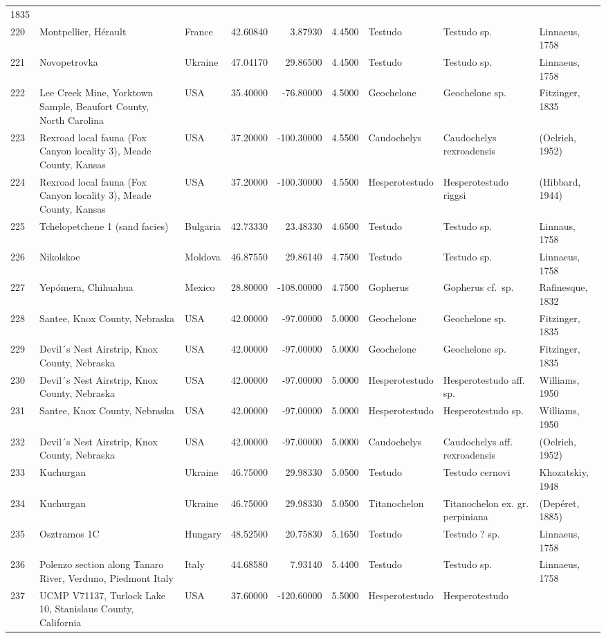 \documentclass[]{article}
\begin{document}
\begin{longtable}[]{@{}lllrrrlll@{}}
1835\tabularnewline
220 & Montpellier, Hérault & France & 42.60840 & 3.87930 & 4.4500 &
Testudo & Testudo sp. & Linnaeus, 1758\tabularnewline
221 & Novopetrovka & Ukraine & 47.04170 & 29.86500 & 4.4500 & Testudo &
Testudo sp. & Linnaeus, 1758\tabularnewline
222 & Lee Creek Mine, Yorktown Sample, Beaufort County, North Carolina &
USA & 35.40000 & -76.80000 & 4.5000 & Geochelone & Geochelone sp. &
Fitzinger, 1835\tabularnewline
223 & Rexroad local fauna (Fox Canyon locality 3), Meade County, Kansas
& USA & 37.20000 & -100.30000 & 4.5500 & Caudochelys & Caudochelys
rexroadensis & (Oelrich, 1952)\tabularnewline
224 & Rexroad local fauna (Fox Canyon locality 3), Meade County, Kansas
& USA & 37.20000 & -100.30000 & 4.5500 & Hesperotestudo & Hesperotestudo
riggsi & (Hibbard, 1944)\tabularnewline
225 & Tchelopetchene 1 (sand facies) & Bulgaria & 42.73330 & 23.48330 &
4.6500 & Testudo & Testudo sp. & Linnaus, 1758\tabularnewline
226 & Nikolskoe & Moldova & 46.87550 & 29.86140 & 4.7500 & Testudo &
Testudo sp. & Linnaeus, 1758\tabularnewline
227 & Yepómera, Chihuahua & Mexico & 28.80000 & -108.00000 & 4.7500 &
Gopherus & Gopherus cf.~sp. & Rafinesque, 1832\tabularnewline
228 & Santee, Knox County, Nebraska & USA & 42.00000 & -97.00000 &
5.0000 & Geochelone & Geochelone sp. & Fitzinger, 1835\tabularnewline
229 & Devil´s Nest Airstrip, Knox County, Nebraska & USA & 42.00000 &
-97.00000 & 5.0000 & Geochelone & Geochelone sp. & Fitzinger,
1835\tabularnewline
230 & Devil´s Nest Airstrip, Knox County, Nebraska & USA & 42.00000 &
-97.00000 & 5.0000 & Hesperotestudo & Hesperotestudo aff. sp. &
Williams, 1950\tabularnewline
231 & Santee, Knox County, Nebraska & USA & 42.00000 & -97.00000 &
5.0000 & Hesperotestudo & Hesperotestudo sp. & Williams,
1950\tabularnewline
232 & Devil´s Nest Airstrip, Knox County, Nebraska & USA & 42.00000 &
-97.00000 & 5.0000 & Caudochelys & Caudochelys aff. rexroadensis &
(Oelrich, 1952)\tabularnewline
233 & Kuchurgan & Ukraine & 46.75000 & 29.98330 & 5.0500 & Testudo &
Testudo cernovi & Khozatskiy, 1948\tabularnewline
234 & Kuchurgan & Ukraine & 46.75000 & 29.98330 & 5.0500 & Titanochelon
& Titanochelon ex. gr. perpiniana & (Depéret, 1885)\tabularnewline
235 & Osztramos 1C & Hungary & 48.52500 & 20.75830 & 5.1650 & Testudo &
Testudo ? sp. & Linnaeus, 1758\tabularnewline
236 & Polenzo section along Tanaro River, Verduno, Piedmont Italy &
Italy & 44.68580 & 7.93140 & 5.4400 & Testudo & Testudo sp. & Linnaeus,
1758\tabularnewline
237 & UCMP V71137, Turlock Lake 10, Stanislaus County, California & USA
& 37.60000 & -120.60000 & 5.5000 & Hesperotestudo & Hesperotestudo

\end{longtable}
\end{document}
